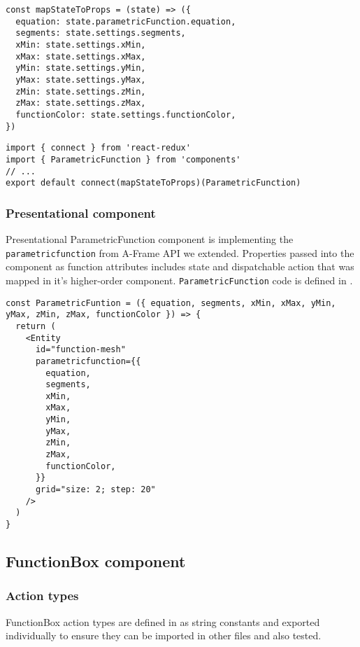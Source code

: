 \begin{lstlisting}[caption={Function to map \texttt{parametricFunction}  and \texttt{settings} state to component properties.},captionpos=b]
const mapStateToProps = (state) => ({
  equation: state.parametricFunction.equation,
  segments: state.settings.segments,
  xMin: state.settings.xMin,
  xMax: state.settings.xMax,
  yMin: state.settings.yMin,
  yMax: state.settings.yMax,
  zMin: state.settings.zMin,
  zMax: state.settings.zMax,
  functionColor: state.settings.functionColor,
})
\end{lstlisting}

\begin{lstlisting}[caption={Creation of \texttt{ParametricFunction} higher-order component.},captionpos=b]
import { connect } from 'react-redux'
import { ParametricFunction } from 'components'
// ...
export default connect(mapStateToProps)(ParametricFunction)
\end{lstlisting}

\subsubsection{Presentational component}
Presentational ParametricFunction component is implementing the \texttt{\justify parametricfunction} from A-Frame API we extended. Properties passed into the component as function attributes includes state and dispatchable action that was mapped in it's higher-order component. \texttt{ParametricFunction} code is defined in .

\begin{lstlisting}[caption={Presentational \texttt{ParametricFunction} component code.},captionpos=b]
const ParametricFuntion = ({ equation, segments, xMin, xMax, yMin, yMax, zMin, zMax, functionColor }) => {
  return (
    <Entity
      id="function-mesh"
      parametricfunction={{
        equation,
        segments,
        xMin,
        xMax,
        yMin,
        yMax,
        zMin,
        zMax,
        functionColor,
      }}
      grid="size: 2; step: 20"
    />
  )
}
\end{lstlisting}

\subsection{FunctionBox component}
\subsubsection{Action types}
FunctionBox action types are defined in  as string constants and exported individually to ensure they can be imported in other files and also tested.


